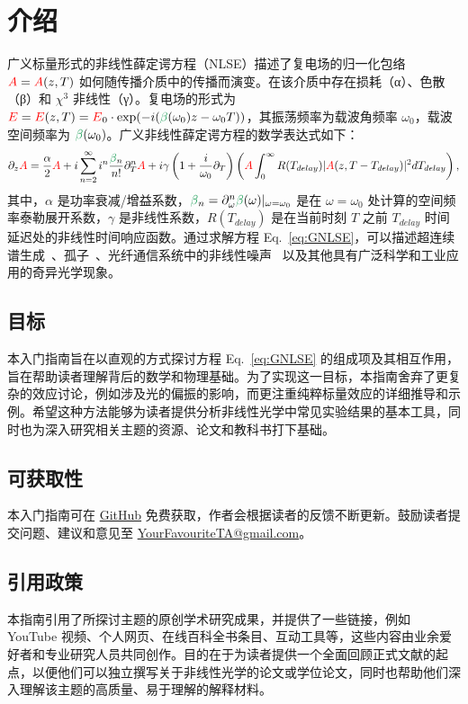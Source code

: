 \chapter{介绍}
\label{ch:Introduction}
广义标量形式的非线性薛定谔方程（NLSE）描述了复电场的归一化包络 \(\textcolor{red}{A} = \textcolor{red}{A}(z,T)\) 如何随传播介质中的传播而演变。在该介质中存在损耗（α）、色散（β）和 \(\chi^{3}\) 非线性（γ）。复电场的形式为 \(\E = \E(z,T) = \E_0 \cdot \exp(-i(\betag(\omega_0)z - \omega_0 T))\)，其振荡频率为载波角频率 \(\omega_0\)，载波空间频率为 \(\betag(\omega_0)\)。广义非线性薛定谔方程的数学表达式如下：
\begin{align}
    \label{eq:GNLSE}
    \partial_z \A = \frac{\alpha}{2}\A+i \sum_{n=2}^{\infty}i^n \frac{\betag_n}{n!}\partial_T^n\A  + i\gamma\left(1+\frac{i}{\omega_0}\partial_T  \right)\left( 
\A \int_{0}^{\infty} R(T_{delay})|\A(z,T-T_{delay})|^2 dT_{delay} \right),
\end{align}
其中，\(\alpha\) 是功率衰减/增益系数，\(\betag_n = \partial_\omega^n \betag(\omega)|_{\omega = \omega_0}\) 是在 \(\omega = \omega_0\) 处计算的空间频率泰勒展开系数，\(\gamma\) 是非线性系数，\(R(T_{delay})\) 是在当前时刻 \(T\) 之前 \(T_{delay}\) 时间延迟处的非线性时间响应函数。通过求解方程 Eq.~\ref{eq:GNLSE}，可以描述超连续谱生成~\cite{supercontinuum_original_paper,NLSE_original}、孤子~\cite{soliton_first_theory,Soliton_experimental_first}、光纤通信系统中的非线性噪声~\cite{poggiolini2014detailedanalyticalderivationgn} 以及其他具有广泛科学和工业应用的奇异光学现象。
\section{目标}
本入门指南旨在以直观的方式探讨方程 Eq.~\ref{eq:GNLSE} 的组成项及其相互作用，旨在帮助读者理解背后的数学和物理基础。为了实现这一目标，本指南舍弃了更复杂的效应讨论，例如涉及光的偏振的影响，而更注重纯粹标量效应的详细推导和示例。希望这种方法能够为读者提供分析非线性光学中常见实验结果的基本工具，同时也为深入研究相关主题的资源、论文和教科书打下基础。

\section{可获取性}
本入门指南可在 \href{https://github.com/OleKrarup123/NLSE-primer}{GitHub} 免费获取，作者会根据读者的反馈不断更新。鼓励读者提交问题、建议和意见至 \href{yourfavouriteta@gmail.com}{YourFavouriteTA@gmail.com}。

\section{引用政策}
本指南引用了所探讨主题的原创学术研究成果，并提供了一些链接，例如 YouTube 视频、个人网页、在线百科全书条目、互动工具等，这些内容由业余爱好者和专业研究人员共同创作。目的在于为读者提供一个全面回顾正式文献的起点，以便他们可以独立撰写关于非线性光学的论文或学位论文，同时也帮助他们深入理解该主题的高质量、易于理解的解释材料。

